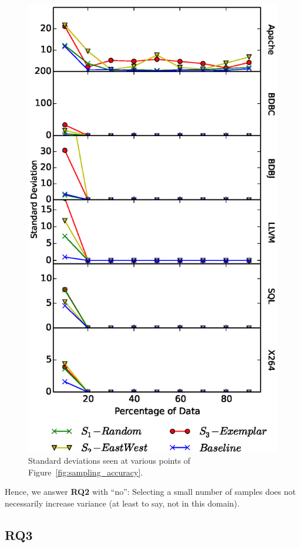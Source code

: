 \documentclass{newsig}
\newcommand{\fig}[1]{Figure~\ref{fig:#1}}
\begin{document}
\begin{figure}[tbh]
\centering
\includegraphics[width=0.9\columnwidth]{Figures/Variance}
\caption{Standard deviations seen at various points of  \fig{sampling_accuracy}.}\label{fig:Variance}
\end{figure}

\begin{myshadowbox}
Hence, we answer {\bf RQ2} with ``no'': Selecting a small number of samples does not necessarily increase variance (at least to say, not in this domain).
\end{myshadowbox}

\newpage
\subsection{RQ3}
\end{document}

